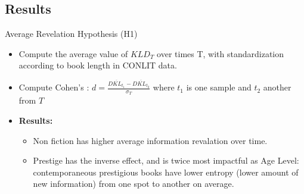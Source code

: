 \documentclass[aspectratio=169]{beamer}
\begin{document}
\subsection{Results}

\begin{frame}{Average Revelation Hypothesis (H1)}
    \begin{itemize}
        \item Compute the average value of $KLD_{T}$ over times T, with standardization according to book length in CONLIT data.
        \item Compute Cohen's : $d = \frac{\overline{DKL_{t_{1}}} - \overline{DKL_{t_{2}}}}{\sigma_{T}}$ where $t_{1}$ is one sample and $t_{2}$ another from $T$
        \item \textbf{Results:}
        \begin{itemize}
            \item Non fiction has higher average information revalation over time.
            \item Prestige has the inverse effect, and is twice most impactful as Age Level: contemporaneous prestigious books have lower entropy (lower amount of new information) from one spot to another on average.
        \end{itemize}
    \end{itemize}
\end{frame}
\end{document}
